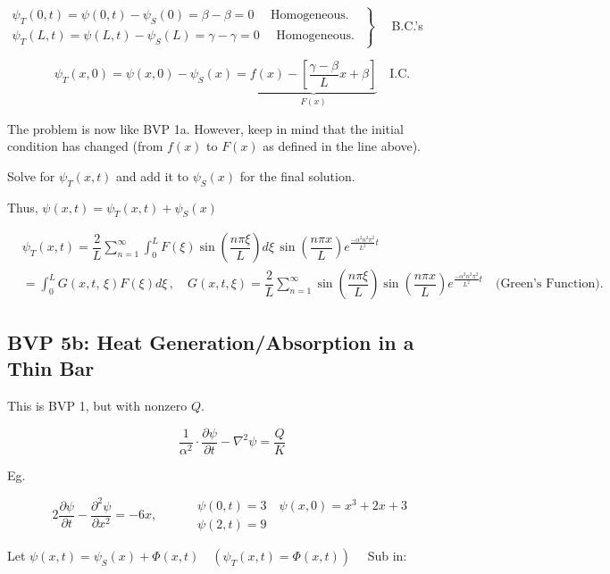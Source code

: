 \documentclass{report}
\begin{document}
$\left.\begin{array}{l}
    \psi_{T}(0, t)=\psi(0, t)-\psi_{S}(0)=\beta-\beta=0 \quad \text {  Homogeneous. } \\
    \psi_{T}(L, t)=\psi(L, t)-\psi_{S}(L)=\gamma-\gamma=0 \quad \text { Homogeneous. } 
\end{array}\right\}\quad$ B.C.'s

$$
\psi_{T}(x, 0)=\psi(x, 0)-\psi_{S}(x)
=\underbrace{f(x)-\left[\frac{\gamma-\beta}{L}x+\beta\right]}_{F(x)}
\quad \text{I.C.}
$$

The problem is now like BVP 1a. However, keep in mind that the initial condition has changed (from $f(x)$ to $F(x)$ as defined in the line above).

Solve for $\psi_{T}(x, t)$ and add it to $\psi_{S}(x)$ for the final solution. 

Thus, $\psi(x, t)=\psi_{T}(x, t)+\psi_{S}(x)$

$$
\begin{aligned}
& \psi_{T}(x, t)=\dfrac{2}{L} \sum_{n=1}^{\infty} \int_{0}^{L} F(\xi) \sin\left(\dfrac{n \pi \xi}{L}\right)d\xi\, \sin\left(\dfrac{n \pi x}{L}\right)e^{\frac{-\alpha^{2}n^{2}\pi^{2}}{L^{2}}t} \\
& =\int_{0}^{L} G(x, t,\,\xi) F(\xi)d\xi\, ,\quad G(x, t, \xi)=\dfrac{2}{L} \sum_{n=1}^{\infty} \sin\left(\dfrac{n \pi \xi}{L}\right) \sin\left(\dfrac{n \pi x}{L}\right)e^{\frac{-\alpha^{2}n^{2}\pi^{2}}{L^{2}}t}\quad \text{(Green's Function).}
\end{aligned}
$$


\subsection{BVP 5b: Heat Generation/Absorption in a Thin Bar}

This is BVP 1, but with nonzero $Q$.

$$
\dfrac{1}{\alpha^{2}} \cdot \dfrac{\partial \psi}{\partial t}-\nabla^{2} \psi=\dfrac{Q}{K}
$$

Eg.

$$
2 \dfrac{\partial \psi}{\partial t}-\dfrac{\partial^{2} \psi}{\partial x^{2}}=-6 x,\qquad
\begin{aligned}
& \psi(0, t)=3 \quad \psi(x, 0)=x^{3}+2 x+3 \\
& \psi(2, t)=9
\end{aligned}
$$

Let $\psi(x, t)=\psi_{S}(x)+\Phi(x, t) \quad\left(\psi_{T}(x, t)=\Phi(x, t)\right) \quad$ Sub in:
\end{document}
